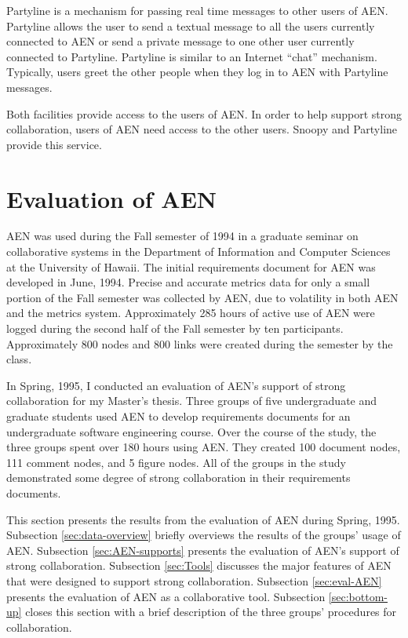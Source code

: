 Partyline is a mechanism for passing real time messages to other users of
AEN.  Partyline allows the user to send a textual message to all the users
currently connected to AEN or send a private message to one other user
currently connected to Partyline.  Partyline is similar to an Internet
``chat'' mechanism.  Typically, users greet the other people when they
log in to AEN with Partyline messages.

Both facilities provide access to the users of AEN.  In order to help
support strong collaboration, users of AEN need access to the other users.
Snoopy and Partyline provide this service.


\section{Evaluation of AEN}
\label{sec:evaluation}


AEN was used during the Fall semester of 1994 in a graduate seminar on
collaborative systems in the Department of Information and Computer
Sciences at the University of Hawaii. The initial requirements document for
AEN \cite{csdl-94-06} was developed in June, 1994. Precise and accurate
metrics data for only a small portion of the Fall semester was collected by
AEN, due to volatility in both AEN and the metrics system.  Approximately
285 hours of active use of AEN were logged during the second half of the
Fall semester by ten participants.  Approximately 800 nodes and 800 links
were created during the semester by the class.

In Spring, 1995, I conducted an evaluation of AEN's support of strong
collaboration for my Master's thesis.  Three groups of five undergraduate
and graduate students used AEN to develop requirements documents for an
undergraduate software engineering course.  Over the course of the study,
the three groups spent over 180 hours using AEN. They created 100 document
nodes, 111 comment nodes, and 5 figure nodes.  All of the groups in the
study demonstrated some degree of strong collaboration in their
requirements documents.



This section presents the results from the evaluation of AEN during Spring,
1995.  Subsection \ref{sec:data-overview} briefly overviews the results of the
groups' usage of AEN.  Subsection \ref{sec:AEN-supports} presents the
evaluation of AEN's support of strong collaboration.  Subsection
\ref{sec:Tools} discusses the major features of AEN that were designed to
support strong collaboration.  Subsection \ref{sec:eval-AEN} presents the
evaluation of AEN as a collaborative tool.  Subsection \ref{sec:bottom-up}
closes this section with a brief description of the three groups'
procedures for collaboration.


